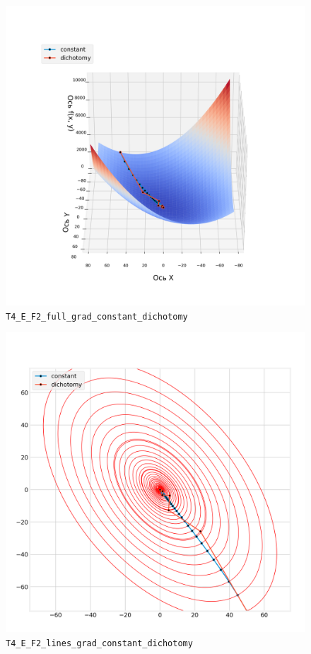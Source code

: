 \documentclass[12pt, a4paper, oneside, final]{article}
\begin{document}
	\begin{center}
		\begin{figure}[H]
			\centering
			\includegraphics[scale=0.68]{Image/T4_E_F2_full_grad_constant_dichotomy.png}
			\caption*{\texttt{T4\_E\_F2\_full\_grad\_constant\_dichotomy}}
		\end{figure}
		\begin{figure}[H]
			\centering
			\includegraphics[scale=0.68]{Image/T4_E_F2_lines_grad_constant_dichotomy.png}
			\caption*{\texttt{T4\_E\_F2\_lines\_grad\_constant\_dichotomy}}
		\end{figure}
	\end{center}
	\newpage
\end{document}
